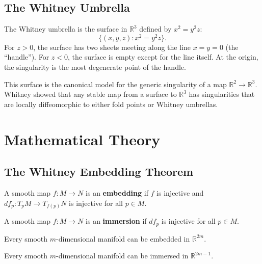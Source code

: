 \subsection{The Whitney Umbrella}

The Whitney umbrella is the surface in $\mathbb{R}^3$ defined by $x^2 = y^2 z$:
\[
\{(x,y,z) : x^2 = y^2 z\}.
\]
For $z > 0$, the surface has two sheets meeting along the line $x = y = 0$ (the ``handle''). For $z < 0$, the surface is empty except for the line itself. At the origin, the singularity is the most degenerate point of the handle.

This surface is the canonical model for the generic singularity of a map $\mathbb{R}^2 \to \mathbb{R}^3$. Whitney showed that any stable map from a surface to $\mathbb{R}^3$ has singularities that are locally diffeomorphic to either fold points or Whitney umbrellas.

\section{Mathematical Theory}

\subsection{The Whitney Embedding Theorem}

\begin{definition}[Embedding]
A smooth map $f: M \to N$ is an \textbf{embedding} if $f$ is injective and $df_p: T_pM \to T_{f(p)}N$ is injective for all $p \in M$.
\end{definition}

\begin{definition}[Immersion]
A smooth map $f: M \to N$ is an \textbf{immersion} if $df_p$ is injective for all $p \in M$.
\end{definition}

\begin{theorem}
Every smooth $m$-dimensional manifold can be embedded in $\mathbb{R}^{2m}$.
\end{theorem}

\begin{theorem}
Every smooth $m$-dimensional manifold can be immersed in $\mathbb{R}^{2m-1}$.
\end{theorem}

